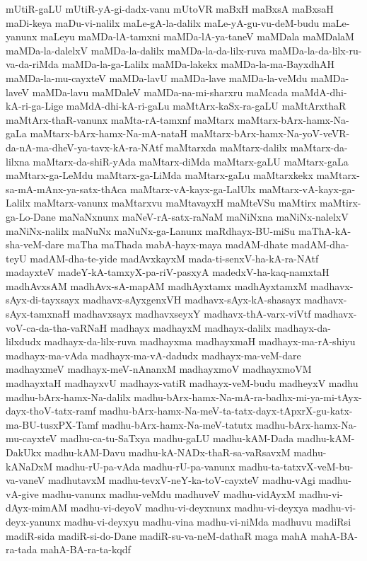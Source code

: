 {mUtiR-gaLU
mUtiR-yA-gi-dadx-vanu
mUtoVR
maBxH
maBxsA
maBxsaH
maDi-keya
maDu-vi-nalilx
maLe-gA-la-dalilx
maLe-yA-gu-vu-deM-budu
maLe-yanunx
maLeyu
maMDa-lA-tamxni
maMDa-lA-ya-taneV
maMDala
maMDalaM
maMDa-la-dalelxV
maMDa-la-dalilx
maMDa-la-da-lilx-ruva
maMDa-la-da-lilx-ru-va-da-riMda
maMDa-la-ga-Lalilx
maMDa-lakekx
maMDa-la-ma-BayxdhAH
maMDa-la-mu-cayxteV
maMDa-lavU
maMDa-lave
maMDa-la-veMdu
maMDa-laveV
maMDa-lavu
maMDaleV
maMDa-na-mi-sharxru
maMcada
maMdA-dhi-kA-ri-ga-Lige
maMdA-dhi-kA-ri-gaLu
maMtArx-kaSx-ra-gaLU
maMtArxthaR
maMtArx-thaR-vanunx
maMta-rA-tamxnf
maMtarx
maMtarx-bArx-hamx-Na-gaLa
maMtarx-bArx-hamx-Na-mA-nataH
maMtarx-bArx-hamx-Na-yoV-veVR-da-nA-ma-dheV-ya-tavx-kA-ra-NAtf
maMtarxda
maMtarx-dalilx
maMtarx-da-lilxna
maMtarx-da-shiR-yAda
maMtarx-diMda
maMtarx-gaLU
maMtarx-gaLa
maMtarx-ga-LeMdu
maMtarx-ga-LiMda
maMtarx-gaLu
maMtarxkekx
maMtarx-sa-mA-mAnx-ya-satx-thAca
maMtarx-vA-kayx-ga-LalUlx
maMtarx-vA-kayx-ga-Lalilx
maMtarx-vanunx
maMtarxvu
maMtavayxH
maMteVSu
maMtirx
maMtirx-ga-Lo-Dane
maNaNxnunx
maNeV-rA-satx-raNaM
maNiNxna
maNiNx-nalelxV
maNiNx-nalilx
maNuNx
maNuNx-ga-Lanunx
maRdhayx-BU-miSu
maThA-kA-sha-veM-dare
maTha
maThada
mabA-hayx-maya
madAM-dhate
madAM-dha-teyU
madAM-dha-te-yide
madAvxkayxM
mada-ti-senxV-ha-kA-ra-NAtf
madayxteV
madeY-kA-tamxyX-pa-riV-pasxyA
madedxV-ha-kaq-namxtaH
madhAvxsAM
madhAvx-sA-mapAM
madhAyxtamx
madhAyxtamxM
madhavx-sAyx-di-tayxsayx
madhavx-sAyxgenxVH
madhavx-sAyx-kA-shasayx
madhavx-sAyx-tamxnaH
madhavxsayx
madhavxseyxY
madhavx-thA-varx-viVtf
madhavx-voV-ca-da-tha-vaRNaH
madhayx
madhayxM
madhayx-dalilx
madhayx-da-lilxdudx
madhayx-da-lilx-ruva
madhayxma
madhayxmaH
madhayx-ma-rA-shiyu
madhayx-ma-vAda
madhayx-ma-vA-dadudx
madhayx-ma-veM-dare
madhayxmeV
madhayx-meV-nAnanxM
madhayxmoV
madhayxmoVM
madhayxtaH
madhayxvU
madhayx-vatiR
madhayx-veM-budu
madheyxV
madhu
madhu-bArx-hamx-Na-dalilx
madhu-bArx-hamx-Na-mA-ra-badhx-mi-ya-mi-tAyx-dayx-thoV-tatx-ramf
madhu-bArx-hamx-Na-meV-ta-tatx-dayx-tApxrX-gu-katx-ma-BU-tusxPX-Tamf
madhu-bArx-hamx-Na-meV-tatutx
madhu-bArx-hamx-Na-mu-cayxteV
madhu-ca-tu-SaTxya
madhu-gaLU
madhu-kAM-Dada
madhu-kAM-DakUkx
madhu-kAM-Davu
madhu-kA-NADx-thaR-sa-vaRsavxM
madhu-kANaDxM
madhu-rU-pa-vAda
madhu-rU-pa-vanunx
madhu-ta-tatxvX-veM-bu-va-vaneV
madhutavxM
madhu-tevxV-neY-ka-toV-cayxteV
madhu-vAgi
madhu-vA-give
madhu-vanunx
madhu-veMdu
madhuveV
madhu-vidAyxM
madhu-vi-dAyx-mimAM
madhu-vi-deyoV
madhu-vi-deyxnunx
madhu-vi-deyxya
madhu-vi-deyx-yanunx
madhu-vi-deyxyu
madhu-vina
madhu-vi-niMda
madhuvu
madiRsi
madiR-sida
madiR-si-do-Dane
madiR-su-va-neM-dathaR
maga
mahA
mahA-BA-ra-tada
mahA-BA-ra-ta-kqdf
}

